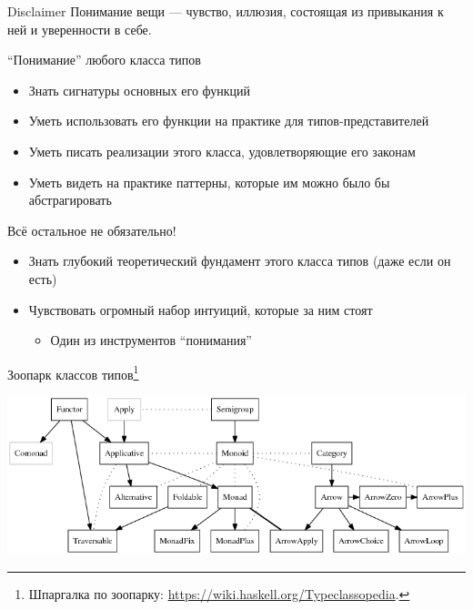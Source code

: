     \begin{frame}[fragile]{Disclaimer}
        Понимание вещи --- чувство, иллюзия, состоящая из привыкания к ней и уверенности в себе.
        \begin{block}{``Понимание'' любого класса типов}
            \begin{itemize}
                \item Знать сигнатуры основных его функций
                \item Уметь использовать его функции на практике для типов-представителей
                \item Уметь писать реализации этого класса, удовлетворяющие его законам
                \item Уметь видеть на практике паттерны, которые им можно было бы абстрагировать
            \end{itemize}
        \end{block}
        \begin{block}{Всё остальное не обязательно!}
            \begin{itemize}
                \item Знать глубокий теоретический фундамент этого класса типов (даже если он есть)
                \item Чувствовать огромный набор интуиций, которые за ним стоят
                \begin{itemize}
                    \item Один из инструментов ``понимания''
                \end{itemize}
            \end{itemize}
        \end{block}
    \end{frame}

    \begin{frame}[fragile]{Зоопарк классов типов\footnote{Шпаргалка по зоопарку: {\color{blue}\url{https://wiki.haskell.org/Typeclassopedia}}.}}
        \begin{center}
            \includegraphics[width=1\textwidth]{figs/Typeclassopedia-diagram}
        \end{center}
    \end{frame}

